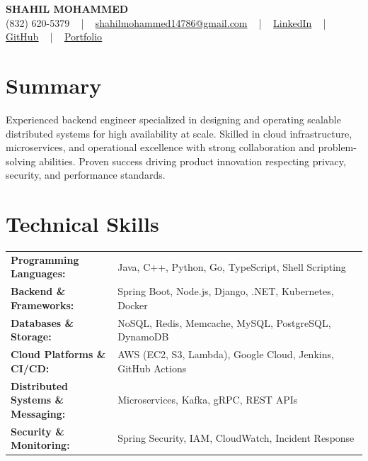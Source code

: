 \documentclass[letterpaper,11pt]{article}
\begin{document}
\begin{center}
    {\fontsize{14pt}{12pt}\selectfont \textbf{\MakeUppercase{Shahil Mohammed}}}\\ \vspace{2pt}
    \fontsize{10pt}{12pt}\selectfont (832) 620-5379 ~ | ~ \href{mailto:shahilmohammed14786@gmail.com}{shahilmohammed14786@gmail.com} ~ | ~  
    \href{https://www.linkedin.com/in/shahil-mohammed-9652931a1/}{\color{blue}\underline{LinkedIn}}  ~ | ~ 
    \href{https://github.com/freakbeast14}{\color{blue}\underline{GitHub}} ~ | ~ 
    \href{https://shahil-mohammed.netlify.app/}{\color{blue}\underline{Portfolio}}
    \vspace{-8pt}
\end{center}

\section{Summary}
\fontsize{9pt}{10pt}\selectfont
Experienced backend engineer specialized in designing and operating scalable distributed systems for high availability at scale. Skilled in cloud infrastructure, microservices, and operational excellence with strong collaboration and problem-solving abilities. Proven success driving product innovation respecting privacy, security, and performance standards.
 \vspace{-5pt}
 
\section{Technical Skills}
        \vspace{-14pt}
        \begin{table}[h]
            \fontsize{9pt}{10pt}\selectfont
            \begin{tabular}{p{0.3\linewidth} p{0.7\linewidth}}
                \textbf{Programming Languages:} & Java, C++, Python, Go, TypeScript, Shell Scripting \\
                \textbf{Backend \& Frameworks:} & Spring Boot, Node.js, Django, .NET, Kubernetes, Docker \\
                \textbf{Databases \& Storage:} & NoSQL, Redis, Memcache, MySQL, PostgreSQL, DynamoDB \\
                \textbf{Cloud Platforms \& CI/CD:} & AWS (EC2, S3, Lambda), Google Cloud, Jenkins, GitHub Actions \\
                \textbf{Distributed Systems \& Messaging:} & Microservices, Kafka, gRPC, REST APIs \\
                \textbf{Security \& Monitoring:} & Spring Security, IAM, CloudWatch, Incident Response \\
            \end{tabular}
        \end{table}
 \vspace{-15pt}
 
\end{document}
